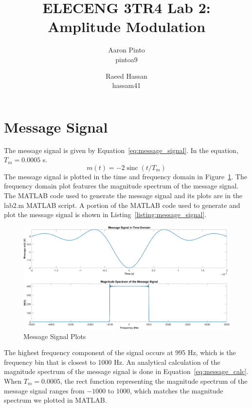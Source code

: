 \documentclass[12pt]{article}
\title{ELECENG 3TR4 Lab 2: Amplitude Modulation}
\author{
    Aaron Pinto \\ pintoa9
    \and
    Raeed Hassan \\ hassam41
}
\DeclareMathOperator{\sinc}{sinc}
\begin{document}
\maketitle
\clearpage

\section*{Message Signal}
The message signal is given by Equation~\ref{eq:message_signal}. In the equation, $T_m = 0.0005$ s.
\begin{equation} \label{eq:message_signal}
    m(t) = -2\sinc(t/T_m)
\end{equation}
The message signal is plotted in the time and frequency domain in Figure~\ref{fig:message_signal}. The frequency domain plot features the magnitude spectrum of the message signal. The MATLAB code used to generate the message signal and its plots are in the lab2.m MATLAB script. A portion of the MATLAB code used to generate and plot the message signal is shown in Listing~\ref{listing:message_signal}.
 
\begin{figure}[h!]
    \centering
    \includegraphics[width=\textwidth]{q1}
    \caption{\label{fig:message_signal}Message Signal Plots}
\end{figure}
The highest frequency component of the signal occurs at 995 Hz, which is the frequency bin that is closest to 1000 Hz. An analytical calculation of the magnitude spectrum of the message signal is done in Equation~\ref{eq:message_calc}. When $T_m = 0.0005$, the rect function representing the magnitude spectrum of the message signal ranges from $-1000$ to $1000$, which matches the magnitude spectrum we plotted in MATLAB.
\end{document}
